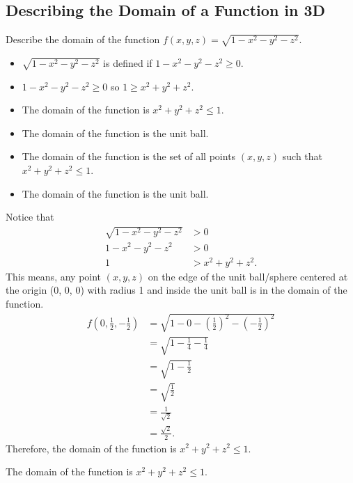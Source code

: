 \documentclass{article}
\begin{document}
\subsection*{Describing the Domain of a Function in 3D}
\begin{examplebox}
Describe the domain of the function \( f(x, y, z) = \sqrt{1-x^2-y^2-z^2} \).
\begin{solutionbox}
\begin{notebox}
\begin{itemize}
    \item \( \sqrt{1-x^2-y^2-z^2} \) is defined if \( 1-x^2-y^2-z^2 \geq 0 \).
    \item \( 1-x^2-y^2-z^2 \geq 0 \) so \( 1 \geq x^2 + y^2 + z^2 \).
    \item The domain of the function is \( x^2 + y^2 + z^2 \leq 1 \).
    \item The domain of the function is the unit ball.
    \item The domain of the function is the set of all points \( (x, y, z) \) such that \( x^2 + y^2 + z^2 \leq 1 \).
    \item The domain of the function is the unit ball.
\end{itemize}
\end{notebox}
Notice that
\begin{align*}
\sqrt{1-x^2-y^2-z^2} &> 0 \\
1-x^2-y^2-z^2 &> 0 \\
1 &> x^2 + y^2 + z^2.
\end{align*}
This means, any point \( (x, y, z) \) on the edge of the unit ball/sphere centered at the origin (0, 0, 0) with radius 1 and inside the unit ball is in the domain of the function.
\begin{align*}
    f(0, \frac{1}{2}, -\frac{1}{2}) &= \sqrt{1 - 0 - \left(\frac{1}{2}\right)^2 - \left(-\frac{1}{2}\right)^2} \\
    &= \sqrt{1 - \frac{1}{4} - \frac{1}{4}} \\
    &= \sqrt{1 - \frac{1}{2}} \\
    &= \sqrt{\frac{1}{2}} \\
    &= \frac{1}{\sqrt{2}} \\
    &= \frac{\sqrt{2}}{2}.
\end{align*}
Therefore, the domain of the function is \( x^2 + y^2 + z^2 \leq 1 \).
\begin{answerbox}
The domain of the function is \( x^2 + y^2 + z^2 \leq 1 \).
\end{answerbox}
\end{solutionbox}
\end{examplebox}
\end{document}
